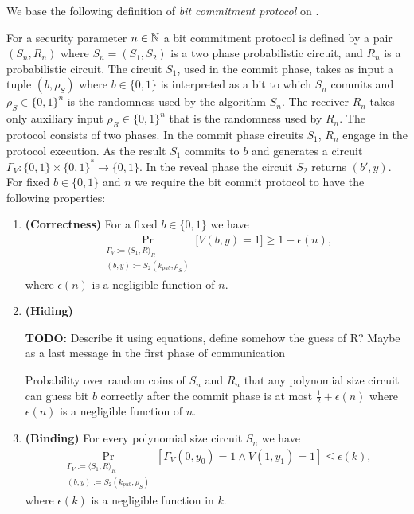 We base the following definition of \textit{bit commitment protocol} on \cite{LectureNotesComThCrypto}.
\begin{definition}
  \label{def:bit_commitment}
For a security parameter $n \in \mathbb{N}$ a \textnormal{bit commitment protocol} is defined by a pair $(S_n, R_n)$
where $S_n = (S_1, S_2)$ is a two phase probabilistic circuit, and $R_n$ is a probabilistic circuit.
The circuit $S_1$, used in the commit phase, takes as input a tuple $(b, \rho_S)$ where $b \in \{0,1\}$ is interpreted as a bit to which $S_n$
commits and $\rho_S \in \{0,1\}^{n}$ is the randomness used by the algorithm $S_n$.
The receiver $R_n$ takes only auxiliary input $\rho_R \in \{0,1\}^{n}$ that is the randomness used by $R_n$.
The protocol consists of two phases. In the commit phase circuits $S_1$, $R_n$ engage in the protocol execution.
As the result $S_1$ commits to $b$ and generates a circuit $\Gamma_V: \{0,1\} \times \{0,1\}^{*} \rightarrow \{0,1\}$.
In the reveal phase the circuit $S_2$ returns $(b', y)$. For fixed $b \in \{0,1\}$ and $n$ we require the bit commit protocol to have the following properties:
\begin{enumerate}[]
\item{\textnormal{\textbf{(Correctness)}}} For a fixed $b \in \{0,1\}$ we have
  \begin{align*}
    \underset{\substack{\Gamma_V := \langle S_1, R \rangle_{R} \\ (b,y) := S_2(k_{pub}, \rho_S) }}{\Pr}\Big[V(b,y) = 1 \Big] \geq 1 - \epsilon(n),
  \end{align*}
where $\epsilon(n)$ is a negligible function of $n$.
\item{\textnormal{\textbf{(Hiding)}}}
  \begin{todo}
    \textbf{TODO:} Describe it using equations, define somehow the guess of R? Maybe as a last message in the first phase of communication
  \end{todo}
  Probability over random coins of $S_n$ and $R_n$ that any polynomial size circuit
  can guess bit $b$ correctly after the commit phase is at most $\frac{1}{2} + \epsilon(n)$ where $\epsilon(n)$ is a negligible function of $n$.
\item{\textnormal{\textbf{(Binding)}}}
  For every polynomial size circuit $S_n$ we have
  \begin{align*}
    \underset{\substack{\Gamma_V := \langle S_1, R \rangle_{R} \\ (b,y) := S_2(k_{pub}, \rho_S)}}{\Pr}[\Gamma_V(0,y_0) = 1 \land V(1,y_1) = 1] \leq \epsilon(k),
  \end{align*}
  where $\epsilon(k)$ is a negligible function in $k$.
\end{enumerate}
\end{definition}

